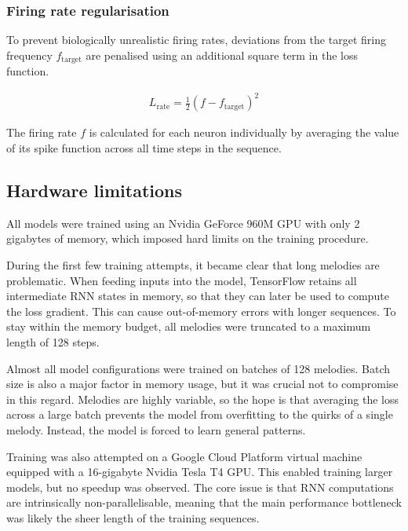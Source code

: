 \documentclass[../../report.tex]{subfiles}
\begin{document}
\subsubsection{Firing rate regularisation}

To prevent biologically unrealistic firing rates, deviations from the target
firing frequency \(f_\mathrm{target}\) are penalised using an additional square
term in the loss function.

\begin{align*}
  L_\mathrm{rate} = \frac{1}{2} (f - f_\mathrm{target})^2
\end{align*}

The firing rate \(f\) is calculated for each neuron individually by averaging
the value of its spike function across all time steps in the sequence.

\subsection{Hardware limitations}

All models were trained using an Nvidia GeForce 960M GPU with only 2 gigabytes
of memory, which imposed hard limits on the training procedure.

During the first few training attempts, it became clear that long melodies are
problematic. When feeding inputs into the model, TensorFlow retains all
intermediate RNN states in memory, so that they can later be used to compute the
loss gradient. This can cause out-of-memory errors with longer sequences. To
stay within the memory budget, all melodies were truncated to a maximum length
of 128 steps.

Almost all model configurations were trained on batches of 128 melodies. Batch
size is also a major factor in memory usage, but it was crucial not to
compromise in this regard. Melodies are highly variable, so the hope is that
averaging the loss across a large batch prevents the model from overfitting to
the quirks of a single melody. Instead, the model is forced to learn general
patterns.

Training was also attempted on a Google Cloud Platform virtual machine equipped
with a 16-gigabyte Nvidia Tesla T4 GPU. This enabled training larger models, but
no speedup was observed. The core issue is that RNN computations are
intrinsically non-parallelisable, meaning that the main performance bottleneck
was likely the sheer length of the training sequences.
\end{document}
